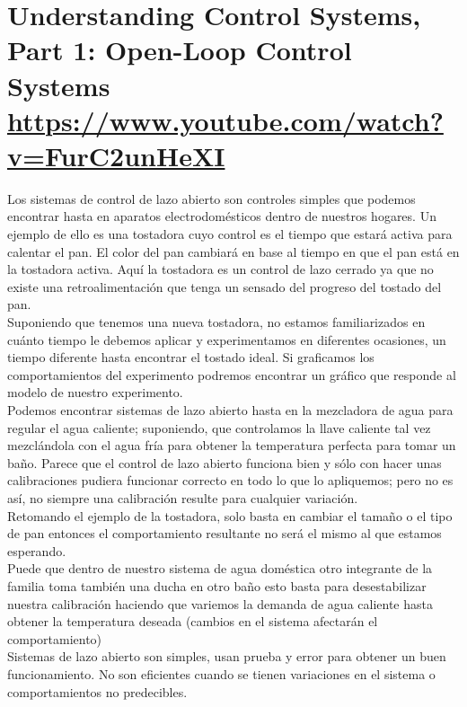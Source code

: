 \documentclass[
	12pt, %
]{fphw}
\begin{document}
\newpage
\section*{{\color{Apricot}Understanding Control Systems, Part 1: Open-Loop Control Systems} \url{https://www.youtube.com/watch?v=FurC2unHeXI}}

Los sistemas de control de lazo abierto son controles simples que podemos encontrar hasta en aparatos electrodomésticos dentro de nuestros hogares. Un ejemplo de ello es una tostadora cuyo control es el tiempo que estará activa para calentar el pan. El color del pan cambiará en base al tiempo en que el pan está en la tostadora activa. Aquí la tostadora es un control de lazo cerrado ya que no existe una retroalimentación que tenga un sensado del progreso del tostado del pan. \\
Suponiendo que tenemos una nueva tostadora, no estamos familiarizados en cuánto tiempo le debemos aplicar y experimentamos en diferentes ocasiones, un tiempo diferente hasta encontrar el tostado ideal. Si graficamos los comportamientos del experimento podremos encontrar un gráfico que responde al modelo de nuestro experimento. \\
Podemos encontrar sistemas de lazo abierto hasta en la mezcladora de agua para regular el agua caliente; suponiendo, que controlamos la llave caliente tal vez mezclándola con el agua fría para obtener la temperatura perfecta para tomar un baño. Parece que el control de lazo abierto funciona bien y sólo con hacer unas calibraciones pudiera funcionar correcto en todo lo que lo apliquemos; pero no es así, no siempre una calibración resulte para cualquier variación. \\
Retomando el ejemplo de la tostadora, solo basta en cambiar el tamaño o el tipo de pan entonces el comportamiento resultante no será el mismo al que estamos esperando. \\
Puede que dentro de nuestro sistema de agua doméstica otro integrante de la familia toma también una ducha en otro baño esto basta para desestabilizar nuestra calibración haciendo que variemos la demanda de agua caliente hasta obtener la temperatura deseada (cambios en el sistema afectarán el comportamiento) \\
Sistemas de lazo abierto son simples, usan prueba y error para obtener un buen funcionamiento. No son eficientes cuando se tienen variaciones en el sistema o comportamientos no predecibles. \\

\newpage
\end{document}
